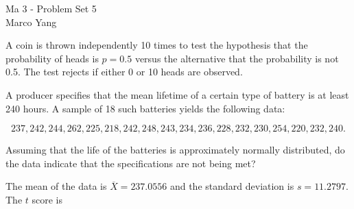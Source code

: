 \documentclass[answers]{exam}
\begin{document}
\begin{center}
{\Large Ma 3 - Problem Set 5} \\
\medskip
Marco Yang \\
\bigskip
\end{center}

\begin{questions}
\question [25] A coin is thrown independently 10 times to test the hypothesis
that the probability of heads is $p=0.5$ versus the alternative that the
probability is not 0.5. The test rejects if either 0 or 10 heads are observed.


\question [25] A producer specifies that the mean lifetime of a certain type of
battery is at least 240 hours. A sample of 18 such batteries yields the
following data:

\[
237, 242, 244, 262, 225, 218, 242, 248, 243, 234, 236, 228, 232, 230, 254, 220, 232, 240
.\] 

Assuming that the life of the batteries is approximately normally distributed,
do the data indicate that the specifications are not being met?

\begin{solution}
The mean of the data is $\overline{X} = 237.0556$ and the standard deviation is 
$s = 11.2797$. The $t$ score is 


\end{solution}
\end{questions}
\end{document}

